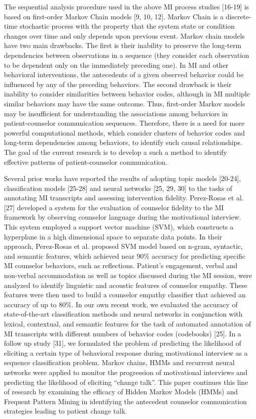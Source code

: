 The sequential analysis procedure used in the above MI process studies [16-19] is based on first-order Markov Chain models [9, 10, 12]. Markov Chain is a discrete-time stochastic process with the property that the system state or condition changes over time and only depends upon previous event. Markov chain models have two main drawbacks. The first is their inability to preserve the long-term dependencies between observations in a sequence (they consider each observation to be dependent only on the immediately preceding one). In MI and other behavioral interventions, the antecedents of a given observed behavior could be influenced by any of the preceding behaviors. The second drawback is their inability to consider similarities between behavior codes, although in MI multiple similar behaviors may have the same outcome. Thus, first-order Markov models may be insufficient for understanding the associations among behaviors in patient-counselor communication sequences. Therefore, there is a need for more powerful computational methods, which consider clusters of behavior codes and long-term dependencies among behaviors, to identify such causal relationships. The goal of the current research is to develop a such a method to identify effective patterns of patient-counselor communication.

Several prior works have reported the results of adopting topic models [20-24], classification models [25-28] and neural networks [25, 29, 30] to the tasks of annotating MI transcripts and assessing intervention fidelity. Perez-Rosas et al. [27] developed a system for the evaluation of counselor fidelity to the MI framework by observing counselor language during the motivational interview. This system employed a support vector machine (SVM), which constructs a hyperplane in a high dimensional space to separate data points. In their approach, Perez-Rosas et al. proposed SVM model based on n-gram, syntactic, and semantic features, which achieved near 90\% accuracy for predicting specific MI counselor behaviors, such as reflections. Patient’s engagement, verbal and non-verbal accommodation as well as topics discussed during the MI session, were analyzed to identify linguistic and acoustic features of counselor empathy. These features were then used to build a counselor empathy classifier that achieved an accuracy of up to 80\%. In our own recent work, we evaluated the accuracy of state-of-the-art classification methods and neural networks in conjunction with lexical, contextual, and semantic features for the task of automated annotation of MI transcripts with different numbers of behavior codes (codebooks) [25].  In a follow up study [31], we formulated the problem of predicting the likelihood of eliciting a certain type of behavioral response during motivational interview as a sequence classification problem. Markov chains, HMMs and recurrent neural networks were applied to monitor the progression of motivational interviews and predicting the likelihood of eliciting “change talk”. This paper continues this line of research by examining the efficacy of Hidden Markov Models (HMMs) and Frequent Pattern Mining in identifying the antecedent counselor communication strategies leading to patient change talk. 

